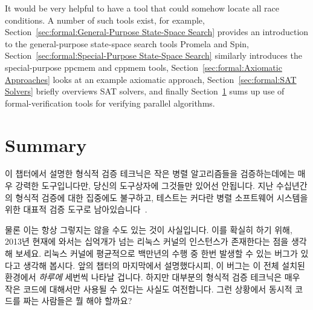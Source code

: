It would be very helpful to have a tool that could somehow locate
all race conditions.
A number of such tools exist, for example,
Section~\ref{sec:formal:General-Purpose State-Space Search} provides an
introduction to the general-purpose state-space search tools Promela and Spin,
Section~\ref{sec:formal:Special-Purpose State-Space Search}
similarly introduces the special-purpose ppcmem and cppmem tools,
Section~\ref{sec:formal:Axiomatic Approaches}
looks at an example axiomatic approach,
Section~\ref{sec:formal:SAT Solvers}
briefly overviews SAT solvers,
and finally
Section~\ref{sec:formal:Summary}
sums up use of formal-verification tools for verifying parallel algorithms.
\fi







\section{Summary}
\label{sec:formal:Summary}

이 챕터에서 설명한 형식적 검증 테크닉은 작은 병렬 알고리즘들을 검증하는데에는
매우 강력한 도구입니다만, 당신의 도구상자에 그것들만 있어선 안됩니다.
지난 수십년간의 형식적 검증에 대한 집중에도 불구하고, 테스트는 커다란 병렬
소프트웨어 시스템을 위한 대표적 검증 도구로
남아있습니다~\cite{JonathanCorbet2006lockdep,DaveJones2011Trinity}.
\iffalse

The formal-verification techniques described in this chapter
are very powerful tools for validating small
parallel algorithms, but they should not be the only tools in your toolbox.
Despite decades of focus on formal verification, testing remains the
validation workhorse for large parallel software
systems~\cite{JonathanCorbet2006lockdep,DaveJones2011Trinity}.
\fi

물론 이는 항상 그렇지는 않을 수도 있는 것이 사실입니다.
이를 확실히 하기 위해, 2013년 현재에 와서는 십억개가 넘는 리눅스 커널의
인스턴스가 존재한다는 점을 생각해 보세요.
리눅스 커널에 평균적으로 백만년의 수행 중 한번 발생할 수 있는 버그가 있다고
생각해 봅시다.
앞의 챕터의 마지막에서 설명했다시피, 이 버그는 이 전체 설치된 환경에서
\emph{하루에} 세번씩 나타날 겁니다.
하지만 대부분의 형식적 검증 테크닉은 매우 작은 코드에 대해서만 사용될 수 있다는
사실도 여전합니다.
그런 상황에서 동시적 코드를 짜는 사람들은 뭘 해야 할까요?
\iffalse

It is nevertheless quite possible that this will not always be the case.
To see this, consider that there are more than one billion instances
of the Linux kernel as of 2013.
Suppose that the Linux kernel has a bug that manifests on average every million
years of runtime.
As noted at the end of the preceding chapter,
this bug will be appearing three times \emph{per day} across the installed
base.
But the fact remains that most formal validation techniques can be used
only on very small code bases.
So what is a concurrency coder to do?
\fi

